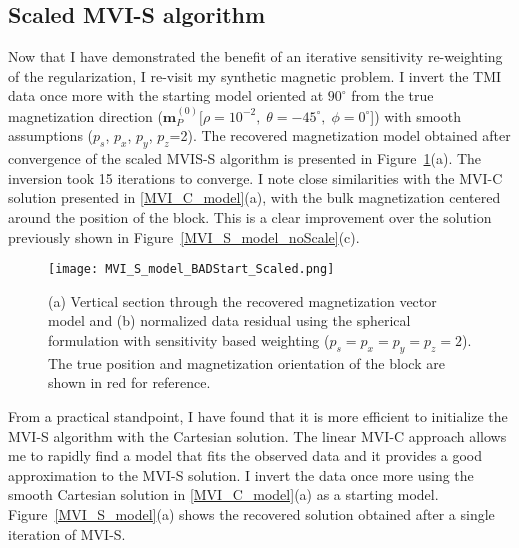 \subsection{Scaled MVI-S algorithm}
Now that I have demonstrated the benefit of an iterative sensitivity re-weighting of the regularization, I re-visit my synthetic magnetic problem.
I invert the TMI data once more with the starting model oriented at $90^\circ$ from the true magnetization direction ($\mathbf{m}_P^{(0)}[\rho=10^{-2},\; \theta=-45^\circ,\;\phi=0^\circ$]) with smooth assumptions ($p_s$, $p_x$, $p_y$, $p_z$=2).
The recovered magnetization model obtained after convergence of the scaled MVIS-S algorithm is presented in Figure~\ref{MVI_S_BadStart_Scaled}(a). The inversion took 15 iterations to converge. I note close similarities with the MVI-C solution presented in \ref{MVI_C_model}(a), with the bulk magnetization centered around the position of the block. This is a clear improvement over the solution previously shown in Figure~\ref{MVI_S_model_noScale}(c).
\begin{figure}[h!]
\texttt{[image: MVI\_S\_model\_BADStart\_Scaled.png]}
\caption{(a) Vertical section through the recovered magnetization vector model and (b) normalized data residual using the spherical formulation with sensitivity based weighting ($p_s=p_x=p_y=p_z = 2$). The true position and magnetization orientation of the block are shown in red for reference. }
\label{MVI_S_BadStart_Scaled}
\end{figure}

From a practical standpoint, I have found that it is more efficient to initialize the MVI-S algorithm with the Cartesian solution. The linear MVI-C approach allows me to rapidly find a model that fits the observed data and it provides a good approximation to the MVI-S solution. I invert the data once more using the smooth Cartesian solution in \ref{MVI_C_model}(a) as a starting model. Figure~\ref{MVI_S_model}(a) shows the recovered solution obtained after a single iteration of MVI-S.

